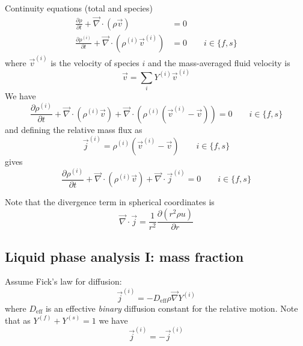 \documentclass[12pt,twoside]{report}
\begin{document}
Continuity equations (total and species)
\begin{align}
  \label{eq:total-continuity}
  \frac{\partial \rho}{\partial t} +
  \vec{\nabla} \cdot (\rho \vec{v}) &= 0 \\
  \label{eq:species-continuity}
  \frac{\partial \rho^{(i)}}{\partial t} +
  \vec{\nabla} \cdot (\rho^{(i)} \vec{v}^{(i)}) &= 0
  \qquad i \in \{f,s\}
\end{align}
where $\vec{v}^{(i)}$ is the velocity of species $i$ and the mass-averaged fluid velocity is
\begin{equation}
  \vec{v} = \sum_i Y^{(i)} \vec{v}^{(i)}
\end{equation}
We have
\begin{equation*}
  \frac{\partial \rho^{(i)}}{\partial t} +
  \vec{\nabla} \cdot (\rho^{(i)} \vec{v}) +
  \vec{\nabla} \cdot (\rho^{(i)} (\vec{v}^{(i)} - \vec{v})) = 0
  \qquad i \in \{f,s\}
\end{equation*}
and defining the relative mass flux as
\begin{equation}\label{eq:relative-mass-flux}
  \vec{j}^{(i)} = \rho^{(i)} (\vec{v}^{(i)} - \vec{v})
  \qquad i \in \{f,s\}
\end{equation}
gives
\begin{equation}\label{eq:species-continuity-relative}
  \frac{\partial \rho^{(i)}}{\partial t} +
  \vec{\nabla} \cdot (\rho^{(i)} \vec{v}) +
  \vec{\nabla} \cdot \vec{j}^{(i)} = 0
  \qquad i \in \{f,s\}
\end{equation}

Note that the divergence term in spherical coordinates is
\begin{equation*}
  \vec{\nabla} \cdot \vec{j} =
  \frac{1}{r^2} \frac{\partial (r^2 \rho u)}{\partial r}
\end{equation*}

\subsection{Liquid phase analysis I: mass fraction}

Assume Fick's law for diffusion:
\begin{equation}\label{eq:ficks-law}
  \vec{j}^{(i)} = -D_{\textrm{eff}} \rho \vec{\nabla} Y^{(i)}
\end{equation}
where $D_{\textrm{eff}}$ is an effective \emph{binary} diffusion constant for the relative motion.
Note that as $Y^{(f)} + Y^{(s)} = 1$ we have
\begin{equation*}
  \vec{j}^{(i)} = -\vec{j}^{(i)}
\end{equation*}
\end{document}
